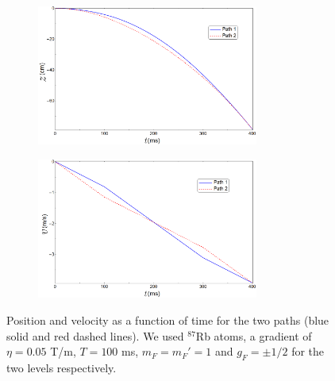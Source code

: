 \documentclass{article}
\begin{document}
\begin{figure}
    \centering
    \begin{subfigure}{1\textwidth}
        \centering
        \includegraphics[width=0.8\textwidth]{posicion.png}
        \label{position_graph}
    \end{subfigure}
    \hfill
    \begin{subfigure}{1\textwidth}
        \centering
        \includegraphics[width=0.8\textwidth]{velocidad.png}
        \label{velocity_graph}
    \end{subfigure}
    \caption{Position and velocity as a function of time for the two paths (blue solid and red dashed lines). We used $^{87}$Rb atoms, a gradient of $\eta = 0.05$ T/m, $T=100$ ms, $m_F=m_F'=1$ and $g_F=\pm 1/2$ for the two levels respectively.}
    \label{velocity_position_graphs}
\end{figure}
\end{document}
